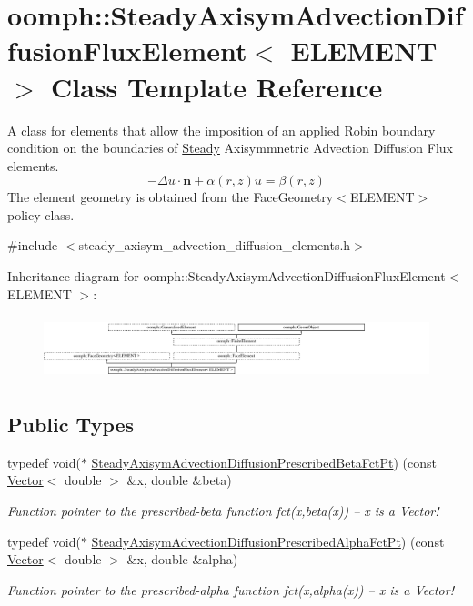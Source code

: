 \hypertarget{classoomph_1_1SteadyAxisymAdvectionDiffusionFluxElement}{}\section{oomph\+:\+:Steady\+Axisym\+Advection\+Diffusion\+Flux\+Element$<$ E\+L\+E\+M\+E\+NT $>$ Class Template Reference}
\label{classoomph_1_1SteadyAxisymAdvectionDiffusionFluxElement}


A class for elements that allow the imposition of an applied Robin boundary condition on the boundaries of \hyperlink{classoomph_1_1Steady}{Steady} Axisymmnetric Advection Diffusion Flux elements. \[ -\Delta u \cdot \mathbf{n} + \alpha(r,z) u = \beta(r,z) \] The element geometry is obtained from the Face\+Geometry$<$\+E\+L\+E\+M\+E\+N\+T$>$ policy class.  




{\ttfamily \#include $<$steady\+\_\+axisym\+\_\+advection\+\_\+diffusion\+\_\+elements.\+h$>$}

Inheritance diagram for oomph\+:\+:Steady\+Axisym\+Advection\+Diffusion\+Flux\+Element$<$ E\+L\+E\+M\+E\+NT $>$\+:\begin{figure}[H]
\begin{center}
\leavevmode
\includegraphics[height=1.871345cm]{classoomph_1_1SteadyAxisymAdvectionDiffusionFluxElement}
\end{center}
\end{figure}
\subsection*{Public Types}
\begin{DoxyCompactItemize}
\item 
typedef void($\ast$ \hyperlink{classoomph_1_1SteadyAxisymAdvectionDiffusionFluxElement_acaec4345326b85f4689043efd2cd1e1c}{Steady\+Axisym\+Advection\+Diffusion\+Prescribed\+Beta\+Fct\+Pt}) (const \hyperlink{classoomph_1_1Vector}{Vector}$<$ double $>$ \&x, double \&beta)
\begin{DoxyCompactList}\small\item\em Function pointer to the prescribed-\/beta function fct(x,beta(x)) -- x is a Vector! \end{DoxyCompactList}\item 
typedef void($\ast$ \hyperlink{classoomph_1_1SteadyAxisymAdvectionDiffusionFluxElement_a28cea997740e6174b3e3583d704229ce}{Steady\+Axisym\+Advection\+Diffusion\+Prescribed\+Alpha\+Fct\+Pt}) (const \hyperlink{classoomph_1_1Vector}{Vector}$<$ double $>$ \&x, double \&alpha)
\begin{DoxyCompactList}\small\item\em Function pointer to the prescribed-\/alpha function fct(x,alpha(x)) -- x is a Vector! \end{DoxyCompactList}\end{DoxyCompactItemize}
